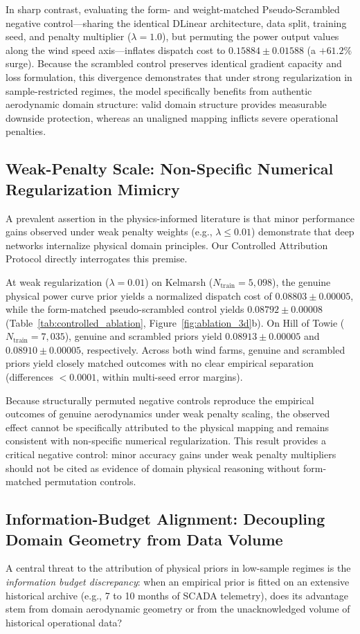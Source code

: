 In sharp contrast, evaluating the form- and weight-matched Pseudo-Scrambled negative control---sharing the identical DLinear architecture, data split, training seed, and penalty multiplier ($\lambda=1.0$), but permuting the power output values along the wind speed axis---inflates dispatch cost to $0.15884 \pm 0.01588$ (a $+61.2\%$ surge). Because the scrambled control preserves identical gradient capacity and loss formulation, this divergence demonstrates that under strong regularization in sample-restricted regimes, the model specifically benefits from authentic aerodynamic domain structure: valid domain structure provides measurable downside protection, whereas an unaligned mapping inflicts severe operational penalties.

\subsection{Weak-Penalty Scale: Non-Specific Numerical Regularization Mimicry}
A prevalent assertion in the physics-informed literature is that minor performance gains observed under weak penalty weights (e.g., $\lambda \le 0.01$) demonstrate that deep networks internalize physical domain principles. Our Controlled Attribution Protocol directly interrogates this premise.

At weak regularization ($\lambda = 0.01$) on Kelmarsh ($N_{\text{train}}=5{,}098$), the genuine physical power curve prior yields a normalized dispatch cost of $0.08803 \pm 0.00005$, while the form-matched pseudo-scrambled control yields $0.08792 \pm 0.00008$ (Table~\ref{tab:controlled_ablation}, Figure~\ref{fig:ablation_3d}b). On Hill of Towie ($N_{\text{train}}=7{,}035$), genuine and scrambled priors yield $0.08913 \pm 0.00005$ and $0.08910 \pm 0.00005$, respectively. Across both wind farms, genuine and scrambled priors yield closely matched outcomes with no clear empirical separation (differences $< 0.0001$, within multi-seed error margins).

Because structurally permuted negative controls reproduce the empirical outcomes of genuine aerodynamics under weak penalty scaling, the observed effect cannot be specifically attributed to the physical mapping and remains consistent with non-specific numerical regularization. This result provides a critical negative control: minor accuracy gains under weak penalty multipliers should not be cited as evidence of domain physical reasoning without form-matched permutation controls.

\subsection{Information-Budget Alignment: Decoupling Domain Geometry from Data Volume}
A central threat to the attribution of physical priors in low-sample regimes is the \textit{information budget discrepancy}: when an empirical prior is fitted on an extensive historical archive (e.g., 7 to 10 months of SCADA telemetry), does its advantage stem from domain aerodynamic geometry or from the unacknowledged volume of historical operational data?


